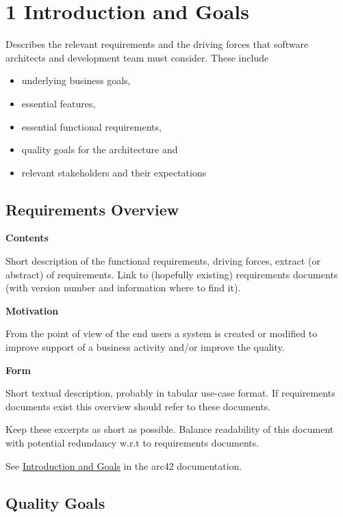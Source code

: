 \hypertarget{section-introduction-and-goals}{%
\section{1 Introduction and Goals}\label{section-introduction-and-goals}}

Describes the relevant requirements and the driving forces that software
architects and development team must consider. These include

\begin{itemize}
\item
  underlying business goals,
\item
  essential features,
\item
  essential functional requirements,
\item
  quality goals for the architecture and
\item
  relevant stakeholders and their expectations
\end{itemize}

\hypertarget{_requirements_overview}{%
\subsection{Requirements Overview}\label{_requirements_overview}}

\textbf{Contents}

Short description of the functional requirements, driving forces,
extract (or abstract) of requirements. Link to (hopefully existing)
requirements documents (with version number and information where to
find it).

\textbf{Motivation}

From the point of view of the end users a system is created or modified
to improve support of a business activity and/or improve the quality.

\textbf{Form}

Short textual description, probably in tabular use-case format. If
requirements documents exist this overview should refer to these
documents.

Keep these excerpts as short as possible. Balance readability of this
document with potential redundancy w.r.t to requirements documents.

See \href{https://docs.arc42.org/section-1/}{Introduction and Goals} in
the arc42 documentation.

\hypertarget{_quality_goals}{%
\subsection{Quality Goals}\label{_quality_goals}}

